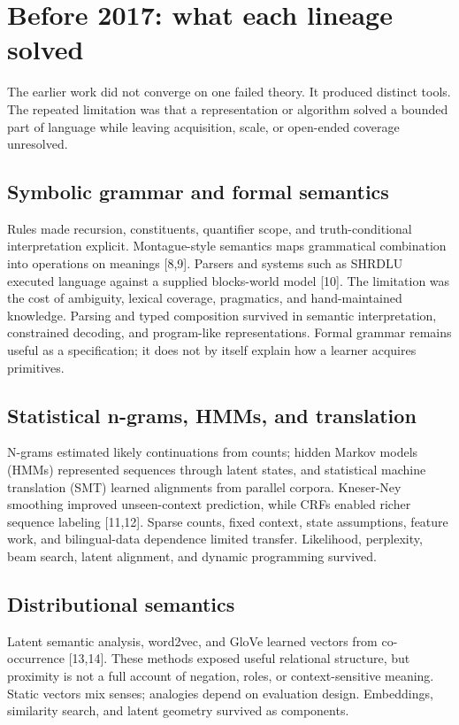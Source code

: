\section{Before 2017: what each lineage solved}
The earlier work did not converge on one failed theory. It produced distinct tools. The repeated limitation was that a representation or algorithm solved a bounded part of language while leaving acquisition, scale, or open-ended coverage unresolved.

\subsection{Symbolic grammar and formal semantics}
Rules made recursion, constituents, quantifier scope, and truth-conditional interpretation explicit. Montague-style semantics maps grammatical combination into operations on meanings [8,9]. Parsers and systems such as SHRDLU executed language against a supplied blocks-world model [10]. The limitation was the cost of ambiguity, lexical coverage, pragmatics, and hand-maintained knowledge. Parsing and typed composition survived in semantic interpretation, constrained decoding, and program-like representations. Formal grammar remains useful as a specification; it does not by itself explain how a learner acquires primitives.

\subsection{Statistical n-grams, HMMs, and translation}
N-grams estimated likely continuations from counts; hidden Markov models (HMMs) represented sequences through latent states, and statistical machine translation (SMT) learned alignments from parallel corpora. Kneser-Ney smoothing improved unseen-context prediction, while CRFs enabled richer sequence labeling [11,12]. Sparse counts, fixed context, state assumptions, feature work, and bilingual-data dependence limited transfer. Likelihood, perplexity, beam search, latent alignment, and dynamic programming survived.

\subsection{Distributional semantics}
Latent semantic analysis, word2vec, and GloVe learned vectors from co-occurrence [13,14]. These methods exposed useful relational structure, but proximity is not a full account of negation, roles, or context-sensitive meaning. Static vectors mix senses; analogies depend on evaluation design. Embeddings, similarity search, and latent geometry survived as components.


